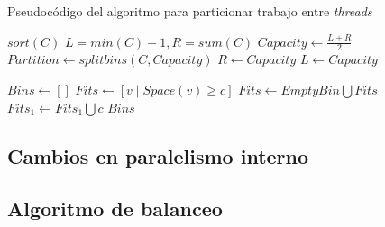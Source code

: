 \begin{algorithm}[H]
    \caption{Pseudoc\'odigo del algoritmo para particionar trabajo entre \textit{threads}}
    \label{algo:partition-algo}
    \begin{algorithmic}
            \State $sort(C)$
            \State $L = min(C)-1, R = sum(C)$
                \Comment{Invariante: $(L, \dots, R]$ contiene la capacidad maxima.}
                \State $Capacity \gets \frac{L+R}{2}$
                \State $Partition \gets splitbins(C,Capacity)$
                    \State $R \gets Capacity$
                \Else
                    \State $L \gets Capacity$
                \EndIf
            \EndWhile
        \EndFunction

            \State $Bins \gets []$
                \State $Fits \gets [v \mid Space(v) \geq c]$
                    \State $Fits \gets EmptyBin \bigcup Fits$
                \EndIf 
                \State $Fits_1 \gets Fits_1 \bigcup c$
            \EndFor
            \Return $Bins$
        \EndFunction
    \end{algorithmic}
\end{algorithm}

\subsection{Cambios en paralelismo interno}

\subsection{Algoritmo de balanceo}
